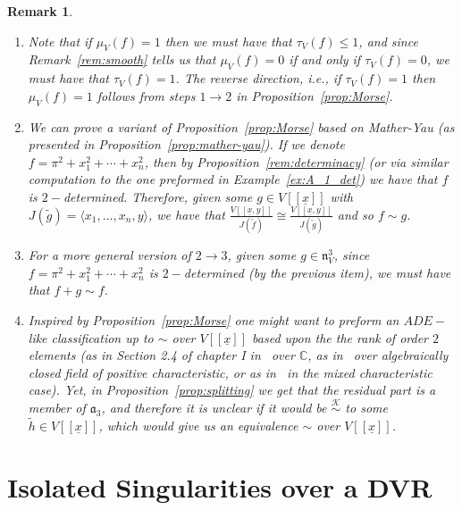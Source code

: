 \documentclass{article}
\newtheorem{remark}[theorem]{Remark}
\newcommand{\equivk}{\overset{\mathcal{K}}{\sim}}
\newcommand{\naxV}{\mathfrak{n}_V}
\newcommand{\Vx}{V[[\underline{x}]]}
\numberwithin{theorem}{section}
\begin{document}
\begin{remark}\label{rem:Morse_milnor}
\begin{enumerate}
    \item \textup{Note that if $\mu_V\left(f\right)=1$ then we must have that $\tau_V\left(f\right) \leq 1$, and since Remark~\ref{rem:smooth} tells us that $\mu_V\left(f\right)=0$ if and only if $\tau_V\left(f\right)=0$,  we must have that $\tau_V\left(f\right)=1$. The reverse direction, i.e., if $\tau_V\left(f\right)=1$ then $\mu_V\left(f\right)=1$ follows from steps $1 \to 2$ in Proposition~\ref{prop:Morse}. }
    \item \textup{We can prove a variant of Proposition~\ref{prop:Morse} based on Mather-Yau (as presented in Proposition~\ref{prop:mather-yau}). If we denote $f=\pi^2 + x_1^2 + \cdots + x_n^2$, then by Proposition~\ref{rem:determinacy} (or via similar computation to the one preformed in Example~\ref{ex:A_1_det}) we have that $f$ is $2-$determined. Therefore, given some $g \in V[[\underline{x}]]$ with $J(\tilde{g})=\langle x_1, \dots, x_n, y \rangle$, we have that $\frac{V[[\underline{x},y]]}{J(\tilde{f})} \cong \frac{V[[\underline{x},y]]}{J(\tilde{g})}$ and so $f \sim g$. }
    \item \textup{For a more general version of $2 \to 3$, given some $g \in \naxV^3$, since $f=\pi^2 + x_1^2 + \cdots + x_n^2$ is $2-$determined (by the previous item), we must have that $f+g \sim f$.}
    \item \textup{Inspired by Proposition~\ref{prop:Morse} one might want to preform an $ADE-$like classification up to $\sim$ over $\Vx$ based upon the the rank of order $2$ elements (as in Section 2.4 of chapter I in~\cite{greuel2007introduction} over $\mathbb{C}$, as in~\cite{greuel1990simple, Nguyen2013classification} over algebraically closed field of positive characteristic, or as in~\cite{carvajal2019covers, svoray2025ade} in the mixed characteristic case). Yet, in Proposition~\ref{prop:splitting} we get that the residual part is a member of $\mathfrak{a}_3$, and therefore it is unclear if it would be $\equivk$ to some $\tilde{h} \in \Vx$, which would give us an equivalence $\sim$ over $\Vx$. }
\end{enumerate}
\end{remark}



\section{Isolated Singularities over a DVR}\label{sec:Jeffries_Hochter}
\end{document}
